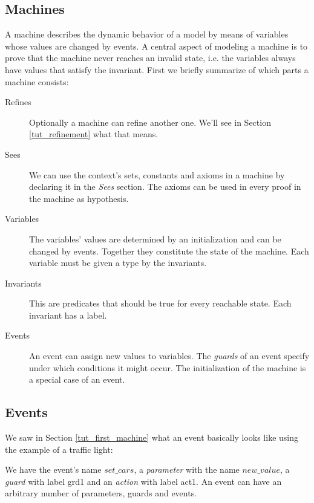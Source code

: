 \subsection{Machines}
\label{tut_machines}

A machine describes the dynamic behavior of a model by means of
variables whose values are changed by events.
A central aspect of modeling a machine is to prove that the machine
never reaches an invalid state, i.e. the variables always have values
that satisfy the invariant.
First we briefly summarize of which parts a machine consists:

\begin{description}
\item[Refines]  Optionally a machine can refine another one.
  We'll see in Section \ref{tut_refinement} what that means.
\item[Sees]  We can use the context's sets, constants and axioms  in
  a machine by declaring it in the \textsl{Sees} section.
  The axioms can be used in every proof in the machine as hypothesis.
\item[Variables] 
  The variables' values are determined by an initialization and
  can be changed by events. Together they constitute the state
  of the machine.
  Each variable must be given a type by the invariants.
\item[Invariants] 
  This are predicates that should be true for every reachable state.
  Each invariant has a label.
\item[Events] 
  An event can assign new values to variables.
  The \emph{guards} of an event specify under which conditions it might occur.
  The initialization of the machine is a special case of an event.
\end{description}

\subsection{Events}
\label{tut_events}

We saw in Section \ref{tut_first_machine} what an event basically looks like using the example of a traffic light:
\begin{description}
		\begin{description}
		\AnyPrm
			\begin{description}
			\end{description}
		\WhereGrd
			\begin{description}
			\nItemX{ grd1 }{ new\_value \in  BOOL }
			\end{description}
		\ThenAct
			\begin{description}
			\nItemX{ act1 }{ cars\_go :=  new\_value }
			\end{description}
		\EndAct
		\end{description}
\end{description}
We have the event's name $set\_cars$, a \emph{parameter} with the name $new\_value$,
a \emph{guard} with label grd1 and an \emph{action} with label act1.
An event can have an arbitrary number of parameters, guards and events.

